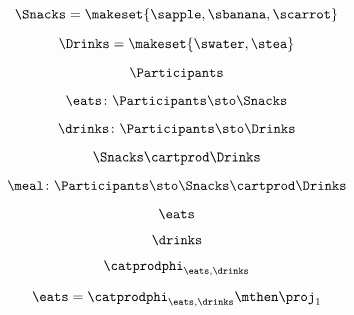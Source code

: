 {\begin{forslides}
        \begin{equation}
            \label{eq:feedback-039}
            \Snacks=\makeset{\sapple,\sbanana,\scarrot}
        \end{equation}

        \begin{equation}
            \label{eq:feedback-040}
            \Drinks=\makeset{\swater,\stea}
        \end{equation}

        \begin{equation}
            \label{eq:feedback-041}
            \Participants
        \end{equation}

        \begin{equation}
            \label{eq:feedback-042}
            \eats \colon \Participants \sto \Snacks
        \end{equation}

        \begin{equation}
            \label{eq:feedback-043}
            \drinks \colon  \Participants \sto \Drinks
        \end{equation}

        \begin{equation}
            \label{eq:feedback-044}
            \Snacks\cartprod \Drinks
        \end{equation}

        \begin{equation}
            \label{eq:feedback-045}
            \meal \colon \Participants\sto \Snacks\cartprod \Drinks
        \end{equation}

        \begin{equation}
            \label{eq:feedback-046}
            \eats
        \end{equation}

        \begin{equation}
            \label{eq:feedback-047}
            \drinks
        \end{equation}

        \begin{equation}
            \label{eq:feedback-048}
            \catprodphi_{\eats,\drinks}
        \end{equation}

        \begin{equation}
            \label{eq:feedback-049}
            \eats =\catprodphi_{\eats,\drinks}\mthen \proj_1
        \end{equation}


\end{forslides}}

